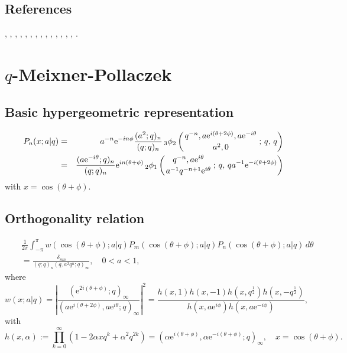 \documentclass[envcountchap,graybox]{svmono}
\newcommand{\qhyp}[5]{\mbox{}_{#1}{\phi}_{#2}
\left(\genfrac{}{}{0pt}{}{#3}{#4}\,;\,q,\,#5\right)}
\newcommand{\e}{\textrm{e}}
\begin{document}
\subsection*{References}
\cite{AlSalam90}, \cite{AlSalamChihara76}, \cite{AlSalamChihara87}, \cite{AskeyIsmail84},
\cite{AskeyRahmanSuslov}, \cite{AtakAtakIII}, \cite{Bryc}, \cite{ChiharaIsmail},
\cite{ChrisIsmail}, \cite{Dehesa}, \cite{Floreanini+97}, \cite{IsmailRahmanSuslov},
\cite{IsmailStanton97}, \cite{KoelinkE}, \cite{Koelink96III}.


\section{$q$-Meixner-Pollaczek}
\par\setcounter{equation}{0}

\subsection*{Basic hypergeometric representation}
\begin{eqnarray}
\label{DefqMP}
P_n(x;a|q)&=&a^{-n}\e^{-in\phi}\frac{(a^2;q)_n}{(q;q)_n}\,
\qhyp{3}{2}{q^{-n},a\e^{i(\theta+2\phi)},a\e^{-i\theta}}{a^2,0}{q}\\
&=&\frac{(a\e^{-i\theta};q)_n}{(q;q)_n}\e^{in(\theta+\phi)}\,
\qhyp{2}{1}{q^{-n},a\e^{i\theta}}{a^{-1}q^{-n+1}\e^{i\theta}}
{qa^{-1}\e^{-i(\theta+2\phi)}}\nonumber
\end{eqnarray}
with $x=\cos(\theta+\phi)$.

\subsection*{Orthogonality relation}
\begin{eqnarray}
\label{OrtqMP}
& &\frac{1}{2\pi}\int_{-\pi}^{\pi}w(\cos(\theta+\phi);a|q)
P_m(\cos(\theta+\phi);a|q)P_n(\cos(\theta+\phi);a|q)\,d\theta\nonumber\\
& &{}=\frac{\,\delta_{mn}}{(q;q)_n(q,a^2q^n;q)_{\infty}},\quad 0<a<1,
\end{eqnarray}
where
$$w(x;a|q)=\left|\frac{(\e^{2i(\theta+\phi)};q)_{\infty}}
{(a\e^{i(\theta+2\phi)},a\e^{i\theta};q)_{\infty}}\right|^2=
\frac{h(x,1)h(x,-1)h(x,q^{\frac{1}{2}})h(x,-q^{\frac{1}{2}})}
{h(x,a\e^{i\phi})h(x,a\e^{-i\phi})},$$
with
$$h(x,\alpha):=\prod_{k=0}^{\infty}\left(1-2\alpha xq^k+\alpha^2q^{2k}\right)
=\left(\alpha\e^{i(\theta+\phi)},\alpha\e^{-i(\theta+\phi)};q\right)_{\infty},
\quad x=\cos(\theta+\phi).$$
\end{document}
